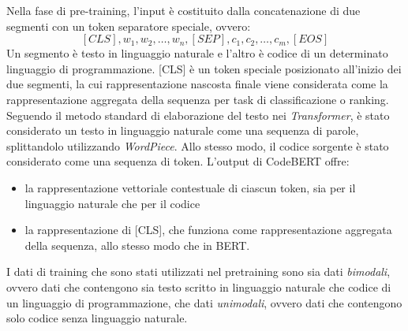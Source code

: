 \documentclass[../../Thesis.tex]{subfiles}
\begin{document}
Nella fase di pre-training, l'input \`e costituito dalla concatenazione di due segmenti con un token separatore speciale, ovvero: $$[CLS], w_1, w_2, \ldots, w_n, [SEP], c_1, c_2, \ldots, c_m, [EOS]$$
Un segmento \`e testo in linguaggio naturale e l'altro \`e codice di un determinato linguaggio di programmazione. [CLS] \`e un token speciale posizionato all'inizio dei due segmenti, la cui rappresentazione nascosta finale viene considerata come la rappresentazione aggregata della sequenza per task di classificazione o ranking. Seguendo il metodo standard di elaborazione del testo nei \textit{Transformer}, \`e stato considerato un testo in linguaggio naturale come una sequenza di parole, splittandolo utilizzando  \textit{WordPiece}. Allo stesso modo, il codice sorgente \`e stato considerato come una sequenza di token.
L'output di CodeBERT offre: 
\begin{itemize}
    \item la rappresentazione vettoriale contestuale di ciascun token, sia per il linguaggio naturale che per il codice
    \item la rappresentazione di [CLS], che funziona come rappresentazione aggregata della sequenza, allo stesso modo che in BERT.
\end{itemize}
I dati di training che sono stati utilizzati nel pretraining sono sia dati \emph{bimodali}, ovvero dati che contengono sia testo scritto in linguaggio naturale che codice di un linguaggio di programmazione, che dati \emph{unimodali}, ovvero dati che contengono solo codice senza linguaggio naturale. 
\end{document}
